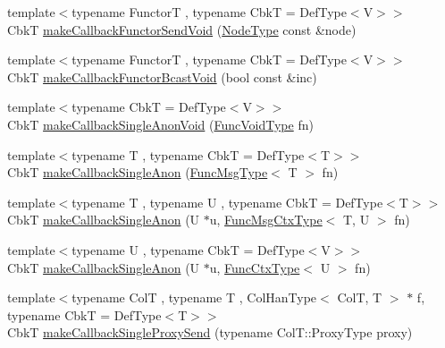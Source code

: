\begin{DoxyCompactItemize}
\item 
{\footnotesize template$<$typename FunctorT , typename CbkT  = Def\+Type$<$\+V$>$$>$ }\\CbkT \hyperlink{structvt_1_1pipe_1_1_pipe_manager_t_l_ac2c128da30637e0672086df5abea84a3}{make\+Callback\+Functor\+Send\+Void} (\hyperlink{namespacevt_a866da9d0efc19c0a1ce79e9e492f47e2}{Node\+Type} const \&node)
\item 
{\footnotesize template$<$typename FunctorT , typename CbkT  = Def\+Type$<$\+V$>$$>$ }\\CbkT \hyperlink{structvt_1_1pipe_1_1_pipe_manager_t_l_af52b65bf8c8ded91ac833b77b3c3c50e}{make\+Callback\+Functor\+Bcast\+Void} (bool const \&inc)
\item 
{\footnotesize template$<$typename CbkT  = Def\+Type$<$\+V$>$$>$ }\\CbkT \hyperlink{structvt_1_1pipe_1_1_pipe_manager_t_l_ac266833a39ac44ecb5e25af77b55723c}{make\+Callback\+Single\+Anon\+Void} (\hyperlink{structvt_1_1pipe_1_1_pipe_manager_base_acd6f0c71f38f08d53f85e83b65406d77}{Func\+Void\+Type} fn)
\item 
{\footnotesize template$<$typename T , typename CbkT  = Def\+Type$<$\+T$>$$>$ }\\CbkT \hyperlink{structvt_1_1pipe_1_1_pipe_manager_t_l_ab34ea3692c443b16199848802aa2dd8c}{make\+Callback\+Single\+Anon} (\hyperlink{structvt_1_1pipe_1_1_pipe_manager_base_aa54eee64ab32a27777a672d49eb861f4}{Func\+Msg\+Type}$<$ T $>$ fn)
\item 
{\footnotesize template$<$typename T , typename U , typename CbkT  = Def\+Type$<$\+T$>$$>$ }\\CbkT \hyperlink{structvt_1_1pipe_1_1_pipe_manager_t_l_a5841de52fc4e59bd5ac844c0d51487e9}{make\+Callback\+Single\+Anon} (U $\ast$u, \hyperlink{structvt_1_1pipe_1_1_pipe_manager_base_a73fdf82ece0411b3dc644c99b763f7a9}{Func\+Msg\+Ctx\+Type}$<$ T, U $>$ fn)
\item 
{\footnotesize template$<$typename U , typename CbkT  = Def\+Type$<$\+V$>$$>$ }\\CbkT \hyperlink{structvt_1_1pipe_1_1_pipe_manager_t_l_aaf15f3c5311092b8237901353ac4be9b}{make\+Callback\+Single\+Anon} (U $\ast$u, \hyperlink{structvt_1_1pipe_1_1_pipe_manager_base_ad8463823b6b4cfdb67c119d6d22e3bac}{Func\+Ctx\+Type}$<$ U $>$ fn)
\item 
{\footnotesize template$<$typename ColT , typename T , Col\+Han\+Type$<$ Col\+T, T $>$ $\ast$ f, typename CbkT  = Def\+Type$<$\+T$>$$>$ }\\CbkT \hyperlink{structvt_1_1pipe_1_1_pipe_manager_t_l_a2c8c3a5aca22b2526fe68dd543a8a888}{make\+Callback\+Single\+Proxy\+Send} (typename Col\+T\+::\+Proxy\+Type proxy)

\end{DoxyCompactItemize}

